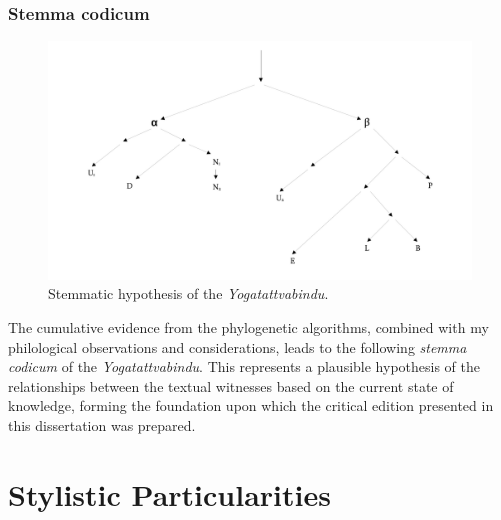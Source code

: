 \subsubsection{Stemma codicum}

\begin{figure}[H]
    \centering
    \includegraphics[width=1\textwidth]{pics/stemma.pdf} %
    \caption{Stemmatic hypothesis of the \emph{Yogatattvabindu}.}
    \label{fig:stemma}
\end{figure}

The cumulative evidence from the phylogenetic algorithms, combined with my philological observations and considerations, leads to the following \textit{stemma codicum} of the \emph{Yogatattvabindu}. This represents a plausible hypothesis of the relationships between the textual witnesses based on the current state of knowledge, forming the foundation upon which the critical edition presented in this dissertation was prepared.



\section{Stylistic Particularities}

